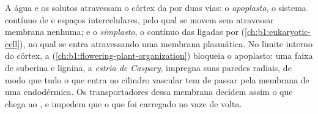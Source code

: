 \begin{definition}\label{def:b1:plant-water-minerals:pathways}
A água e os solutos atravessam o córtex da  por duas vias: o
\emph{apoplasto}, o sistema contínuo de  e espaços
intercelulares, pelo qual se movem sem atravessar membrana nenhuma; e
o \emph{simplasto}, o  contínuo das  ligadas por
 (\cref{ch:b1:eukaryotic-cell}), no qual se entra
atravessando uma membrana plasmática. No limite interno do córtex, a
\emph{} (\cref{ch:b1:flowering-plant-organization}) bloqueia
o apoplasto: uma faixa de suberina e lignina, a
\emph{estria de Caspary}, impregna suas paredes radiais, de modo que
tudo o que entra no cilindro vascular tem de passar pela membrana de
uma  endodérmica. Os transportadores dessa membrana decidem
assim o que chega ao , e impedem que o que foi carregado no
 vaze de volta.
\end{definition}

